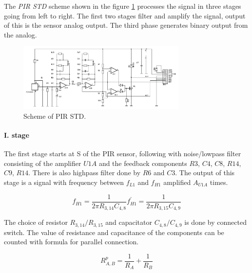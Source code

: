 The {\it PIR STD} scheme shown in the figure \ref{fig:pirstdscheme} processes the signal
in three stages going from left to right. The first two stages filter and amplify the signal,
output of this is the sensor analog output. The third phase generates binary output from the analog.

\begin{figure}[h!]
\begin{center}
\includegraphics[width=0.75\textwidth]{img/pirstd.png}
\caption{Scheme of PIR STD.\cite{PIROperationalManual}\label{fig:pirstdscheme}}
\end{center}
\end{figure}

\paragraph{I. stage}
The first stage starts at S of the PIR sensor, following with noise/lowpass filter consisting
of the amplifier $U1A$ and the feedback components $R3$, $C4$, $C8$, $R14$, $C9$, $R14$.
There is also highpass filter done by $R6$ and $C3$. The output of this stage is a signal
with frequency between $f_{L1}$ and $f_{H1}$ amplified $A_{U1A}$ times.

\begin{subequations}
\begin{equation}
f_{H1} = \frac{1}{2 \pi R_{3,14} C_{4,8}}
\end{equation}

\begin{equation}
f_{H1}^{'} = \frac{1}{2 \pi R_{3,15} C_{4,9}}
\end{equation}
\end{subequations}

The choice of resistor $R_{3,14} / R_{3,15}$ and capacitator $C_{4,8} / C_{4,9}$ is done by
connected switch. The value of resistance and capacitance of the components can be counted
with formula for parallel connection.

\begin{equation}
R_{A,B}^{p} = \frac{1}{R_A} + \frac{1}{R_B}
\end{equation}

